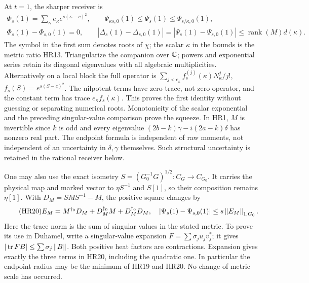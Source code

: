 \documentclass[11pt]{article}
\begin{document}
At \(t=1\), the sharper receiver is
\begin{equation}\tag{HR19}\label{hrv:HR19}
\begin{gathered}
\Phi_s(1)=\sum_\kappa e_\kappa e^{s(\kappa-c)^2},\qquad
\Psi_{\kappa s,0}(1)\le\Psi_s(1)\le\Psi_{s/\kappa,0}(1),\\
\Phi_s(1)-\Phi_{s,0}(1)=0,\qquad
|\Delta_s(1)-\Delta_{s,0}(1)|
=|\Psi_s(1)-\Psi_{s,0}(1)|\le \operatorname{rank}(M)d(\kappa).
\end{gathered}
\end{equation}
The symbol in the first sum denotes roots of \(\chi\); the scalar
\(\kappa\) in the bounds is the metric ratio HR13. Triangularize
the companion over \(\mathbb C\); powers and exponential series retain its
diagonal eigenvalues with all algebraic multiplicities. Alternatively
on a local block the full operator is
\(\sum_{j<e_\kappa}f_s^{(j)}(\kappa)N_\kappa^j/j!\),
\(f_s(S)=e^{s(S-c)^2}\). The nilpotent terms have zero trace, not
zero operator, and the constant term has trace
\(e_\kappa f_s(\kappa)\). This proves the first identity without
guessing or separating numerical roots. Monotonicity of the scalar
exponential and the preceding singular-value comparison prove the
squeeze. In HR1, \(M\) is invertible since \(k\) is odd and every
eigenvalue \((2b-k)\gamma-i(2a-k)\delta\) has nonzero real part.
The endpoint formula is independent of raw moments, not independent
of an uncertainty in \(\delta,\gamma\) themselves. Such structural
uncertainty is retained in the rational receiver below.

One may also use the exact isometry
\(S=(G_0^{-1}G)^{1/2}:C_G\to C_{G_0}\). It carries the physical
map and marked vector to \(\eta S^{-1}\) and \(S[1]\), so their
composition remains \(\eta[1]\). With \(D_M=SMS^{-1}-M\), the
positive square changes by
\begin{equation}\tag{HR20}\label{hrv:HR20}
E_M=M^{\dagger_0}D_M+D_M^{\dagger_0}M+D_M^{\dagger_0}D_M,
\quad |\Psi_s(1)-\Psi_{s,0}(1)|\le s\left\lVert E_M\right\rVert_{1,G_0}.
\end{equation}
Here the trace norm is the sum of singular values in the stated
metric. To prove its use in Duhamel, write a singular-value expansion
\(F=\sum\sigma_j u_jv_j^*\); it gives
\(|\operatorname{tr} FB|\le\sum\sigma_j\left\lVert B\right\rVert\). Both positive heat factors
are contractions. Expansion gives exactly the three terms in HR20,
including the quadratic one. In particular the endpoint radius may
be the minimum of HR19 and HR20. No change of metric scale has occurred.
\end{document}
